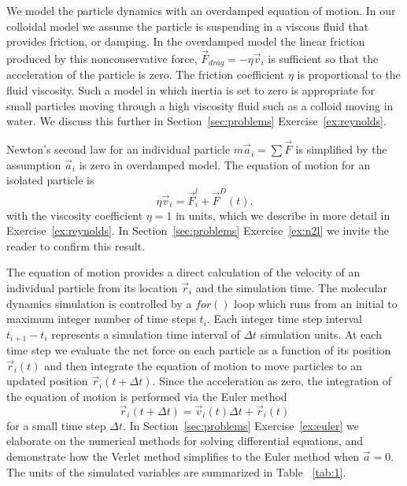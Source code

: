 \documentclass[twocolumn,preprintnumbers,amsmath,amssymb,aps,prx]{revtex4}
\begin{document}
We model the 
particle dynamics 
with an overdamped
equation of motion.
In our colloidal model we assume
the particle is suspending in a viscous fluid
that provides friction, or damping.
In the overdamped model the
linear friction produced by this 
nonconservative force,
$\vec{F}_{drag} = -\eta \vec{v}_i$ is
sufficient so that
the acceleration of the particle is zero.
The friction coefficient $\eta$
is proportional to the fluid viscosity.
Such a model in which inertia is set to zero
is appropriate for small particles
moving through a high viscosity fluid
such as a colloid moving in water.
We discuss this further in 
Section~\ref{sec:problems} Exercise~\ref{ex:reynolds}. %

Newton's second law for an individual particle
$m \vec{a}_i = \sum \vec{F}$ is simplified
by the assumption $\vec{a}_i$ is zero in overdamped model.
The equation of motion for an isolated particle is
\begin{equation}
  \eta \vec{v}_i = \vec{F}^l_{i} + \vec{F}^{D}(t).
    \label{eq:motion}
\end{equation}
with the viscosity coefficient $\eta = 1$ in units,
which we describe in more detail in Exercise~\ref{ex:reynolds}.
In Section~\ref{sec:problems} Exercise~\ref{ex:n2l}
we invite the reader to confirm this result.

The equation of motion provides a direct calculation of the velocity
of an individual particle from its location $\vec{r}_i$ %
and the simulation time.
The molecular dynamics simulation is controlled by a $for()$ loop
 which runs from an initial to maximum integer number of time steps $t_i$.
Each integer time step interval $t_{i+1}-t_i$
represents a simulation time interval of $\Delta t$ 
simulation units.  %
At each time step
we evaluate the net force on each particle as a function of its position
$\vec{r}_i(t)$
and then integrate
the equation of motion to move particles
to an updated position
$\vec{r}_i(t+\Delta t)$.
%
Since the acceleration as zero,
the integration of the equation of motion
is performed via 
the Euler method 
\begin{equation}
  \vec{r}_i(t+\Delta t) = \vec{v}_i(t) \Delta t + \vec{r}_i(t)
    \label{eq:euler}
\end{equation}
for a small time step $\Delta t$.
In Section~\ref{sec:problems} Exercise~\ref{ex:euler}
we elaborate on
the numerical methods for 
solving differential equations,
and demonstrate how the Verlet method
simplifies to the Euler method when $\vec{a}=0$.
%
The units of the simulated variables are summarized in Table ~\ref{tab:1}.
\end{document}
